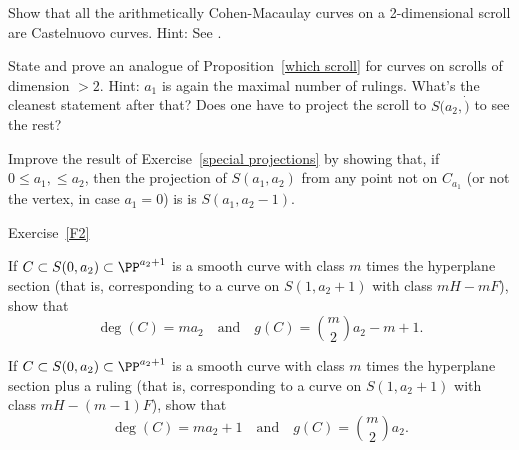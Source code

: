 \begin{exercise}\label{Castelnuovo scrolls}
Show that all the arithmetically Cohen-Macaulay curves on a 2-dimensional scroll are
Castelnuovo curves. Hint: See \cite[Section 3c]{MR685427}.
\end{exercise}


\begin{exercise}
State and prove an analogue of Proposition~\ref{which scroll} for curves on scrolls of dimension $>2$.
Hint: $a_1$ is again the maximal number of rulings. What's the cleanest statement after that? Does one have
to project the scroll to $S(a_2, \dot)$ to see the rest?
\end{exercise}


\begin{exercise}\label{general projections}
Improve the result of Exercise~\ref{special projections} by showing that, if $0\leq a_1,\leq a_2$, then
 the projection of $S(a_1,a_2)$ from any point not on $C_{a_1}$ (or not the vertex, in case $a_1=0$) is 
 is $S(a_1, a_2-1)$.
\end{exercise}

Exercise~\ref{F2}
\begin{exercise}\label{curves on cones}
\item If $C \subset S(0, a_2) \subset \PP^{a_2+1}$ is a smooth curve with class $m$ times the hyperplane section (that is, corresponding to a curve on $S(1,a_2+1)$ with class $mH - mF$), show that
$$
\deg(C) = ma_2 \quad \text{and} \quad g(C) = \binom{m}{2}a_2 - m + 1.
$$
\item If $C \subset S(0, a_2) \subset \PP^{a_2+1}$ is a smooth curve with class $m$ times the hyperplane section plus a ruling (that is, corresponding to a curve on $S(1,a_2+1)$ with class $mH - (m-1)F$), show that
$$
\deg(C) = ma_2 + 1 \quad \text{and} \quad g(C) = \binom{m}{2}a_2.
$$
\end{exercise}

